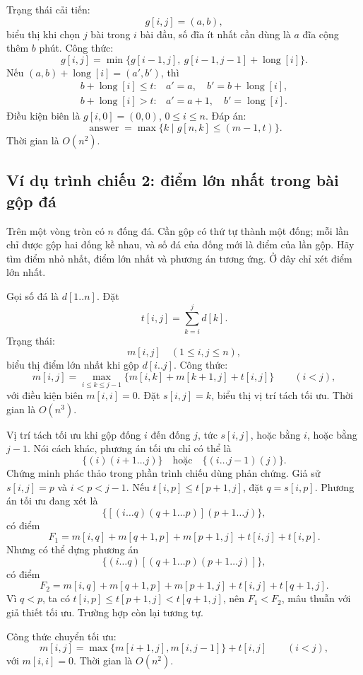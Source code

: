 \documentclass[11pt]{article}
\begin{document}
Trạng thái cải tiến:
\[
  g[i,j]=(a,b),
\]
biểu thị khi chọn \(j\) bài trong \(i\) bài đầu, số đĩa ít nhất cần dùng là
\(a\) đĩa cộng thêm \(b\) phút. Công thức:
\[
  g[i,j]=\min\{g[i-1,j],\ g[i-1,j-1]+\operatorname{long}[i]\}.
\]
Nếu \((a,b)+\operatorname{long}[i]=(a',b')\), thì
\[
\begin{array}{ll}
b+\operatorname{long}[i]\le t: & a'=a,\quad b'=b+\operatorname{long}[i],\\
b+\operatorname{long}[i]> t: & a'=a+1,\quad b'=\operatorname{long}[i].
\end{array}
\]
Điều kiện biên là \(g[i,0]=(0,0)\), \(0\le i\le n\). Đáp án:
\[
  \operatorname{answer}=\max\{k\mid g[n,k]\le (m-1,t)\}.
\]
Thời gian là \(O(n^2)\).

\subsection*{Ví dụ trình chiếu 2: điểm lớn nhất trong bài gộp đá}

Trên một vòng tròn có \(n\) đống đá. Cần gộp có thứ tự thành một đống; mỗi lần
chỉ được gộp hai đống kề nhau, và số đá của đống mới là điểm của lần gộp. Hãy
tìm điểm nhỏ nhất, điểm lớn nhất và phương án tương ứng. Ở đây chỉ xét điểm
lớn nhất.

Gọi số đá là \(d[1..n]\). Đặt
\[
  t[i,j]=\sum_{k=i}^{j}d[k].
\]
Trạng thái:
\[
  m[i,j]\quad (1\le i,j\le n),
\]
biểu thị điểm lớn nhất khi gộp \(d[i..j]\). Công thức:
\[
  m[i,j]=\max_{i\le k\le j-1}\{m[i,k]+m[k+1,j]+t[i,j]\}\qquad (i<j),
\]
với điều kiện biên \(m[i,i]=0\). Đặt \(s[i,j]=k\), biểu thị vị trí tách tối
ưu. Thời gian là \(O(n^3)\).

Vị trí tách tối ưu khi gộp đống \(i\) đến đống \(j\), tức \(s[i,j]\), hoặc
bằng \(i\), hoặc bằng \(j-1\). Nói cách khác, phương án tối ưu chỉ có thể là
\[
  \{(i)(i+1\ldots j)\}\quad\text{hoặc}\quad
  \{(i\ldots j-1)(j)\}.
\]
Chứng minh phác thảo trong phần trình chiếu dùng phản chứng. Giả sử
\(s[i,j]=p\) và \(i<p<j-1\). Nếu \(t[i,p]\le t[p+1,j]\), đặt \(q=s[i,p]\).
Phương án tối ưu đang xét là
\[
  \{[(i\ldots q)(q+1\ldots p)](p+1\ldots j)\},
\]
có điểm
\[
  F_1=m[i,q]+m[q+1,p]+m[p+1,j]+t[i,j]+t[i,p].
\]
Nhưng có thể dựng phương án
\[
  \{(i\ldots q)[(q+1\ldots p)(p+1\ldots j)]\},
\]
có điểm
\[
  F_2=m[i,q]+m[q+1,p]+m[p+1,j]+t[i,j]+t[q+1,j].
\]
Vì \(q<p\), ta có \(t[i,p]\le t[p+1,j]<t[q+1,j]\), nên \(F_1<F_2\), mâu
thuẫn với giả thiết tối ưu. Trường hợp còn lại tương tự.

Công thức chuyển tối ưu:
\[
  m[i,j]=\max\{m[i+1,j],m[i,j-1]\}+t[i,j]\qquad (i<j),
\]
với \(m[i,i]=0\). Thời gian là \(O(n^2)\).
\end{document}
